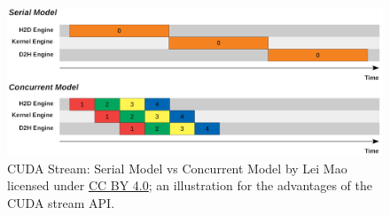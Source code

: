 \begin{figure}
    \centering
    \includegraphics[width=1.\textwidth]{img/cuda-stream.png}
    \caption[CUDA stream illustration]{CUDA Stream: Serial Model vs Concurrent Model by Lei Mao licensed under \href{https://creativecommons.org/licenses/by/4.0/}{CC BY 4.0}; an illustration for the advantages of the CUDA stream API.}
    \label{fig:cuda-stream}
\end{figure}

